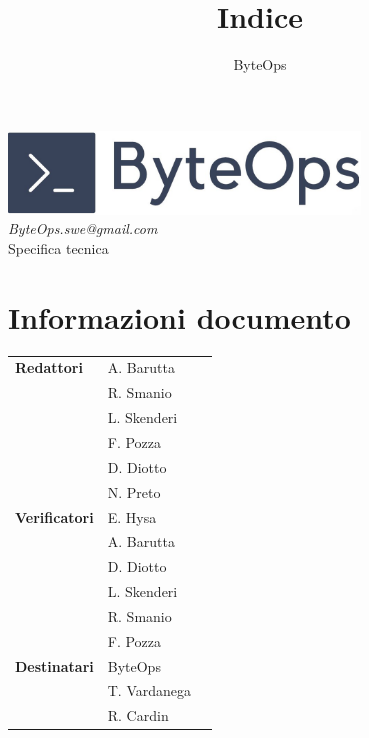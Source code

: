 \documentclass{article}
\title{\textbf{\fontsize{30}{6}\selectfont Indice}}
\author{\fontsize{14}{6}\selectfont ByteOps}
\date{}
\begin{document}
\pagestyle{fancy}
\begin{center}
    \includegraphics[width = 0.7\textwidth]{../Images/logo.png} \\
    \vspace{0.2cm}
    \textcolor[RGB]{60, 60, 60}{\textit{ByteOps.swe@gmail.com}} \\
    \vspace{1cm}
    \fontsize{16}{6}\selectfont Specifica tecnica \\
    \vspace{0.5cm}
\end{center}

\section*{Informazioni documento}
\def\arraystretch{1.2}
\begin{tabular}{>{\raggedleft\arraybackslash}p{}|>{\raggedright\arraybackslash}p{}c}
    \hline
    \addlinespace
    \textbf{Redattori}    & A. Barutta \\ & R. Smanio \\ & L. Skenderi \\ & F. Pozza \\ & D. Diotto \\ & N. Preto \vspace{10pt} \\
    \textbf{Verificatori} & E. Hysa \\ & A. Barutta \\ & D. Diotto \\ & L. Skenderi \\ & R. Smanio \\ & F. Pozza \vspace{10pt} \\
    \textbf{Destinatari}  & ByteOps \\ & T. Vardanega \\ & R. Cardin \vspace{10pt}  \\
\end{tabular}
\pagebreak
\end{document}
